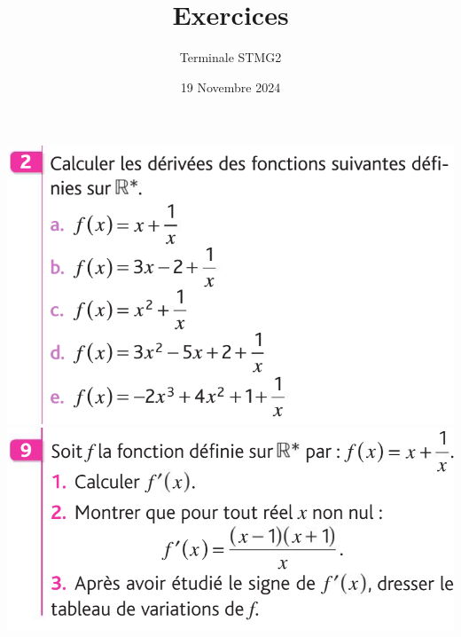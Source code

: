 \documentclass{article}
\title{Exercices}
\date{19 Novembre 2024}
\author{Terminale STMG2}
\begin{document}
\maketitle

\begin{center}
\includegraphics[width=\textwidth]{Exercice_2.png}
\includegraphics[width=\textwidth]{Exercice_1.png}
\end{center}
\end{document}
